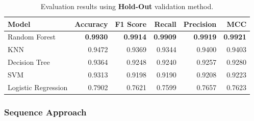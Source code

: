             \begin{table}[htbp]
                \centering
                \begin{tabular}{lrrrrr}
                    \toprule
                    \textbf{Model} & \textbf{Accuracy} & \textbf{F1 Score} & \textbf{Recall} & \textbf{Precision} & \textbf{MCC} \\
                    \midrule
                    Random Forest & \textbf{0.9930} & \textbf{0.9914} & \textbf{0.9909} & \textbf{0.9919} & \textbf{0.9921} \\
                    KNN& 0.9472 & 0.9369 & 0.9344 & 0.9400 & 0.9403 \\
                    Decision Tree & 0.9364 & 0.9248 & 0.9240 & 0.9257 & 0.9280 \\
                    SVM & 0.9313 & 0.9198 & 0.9190 & 0.9208 & 0.9223 \\
                    Logistic Regression & 0.7902 & 0.7621 & 0.7599 & 0.7657 & 0.7623 \\
                    \bottomrule
                \end{tabular}
                \caption{Evaluation results using \textbf{Hold-Out} validation method.}
            \end{table}

            \subsubsection{Sequence Approach}

            
